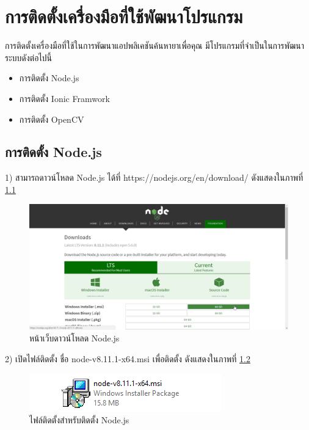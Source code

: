\chapter{การติดตั้งเครื่องมือที่ใช้พัฒนาโปรแกรม}
การติดตั้งเครื่องมือที่ใช้ในการพัฒนาแอปพลิเคชันค้นหายาเพื่อคุณ มีโปรแกรมที่จำเป็นในการพัฒนาระบบดังต่อไปนี้
\begin{itemize}[label={--}]
	\item การติดตั้ง Node.js
    \item การติดตั้ง Ionic Framwork
    \item การติดตั้ง OpenCV
\end{itemize}

\section{การติดตั้ง Node.js}
    1) สามารถดาวน์โหลด Node.js ได้ที่ https://nodejs.org/en/download/ ดังแสดงในภาพที่ \ref{Fig:nodeInstall1}
      \begin{figure}[H]
          \includegraphics[width=\columnwidth]{Figures/7/1}
          \caption{หน้าเว็บดาวน์โหลด Node.js}
          \label{Fig:nodeInstall1}
      \end{figure}
      
    2) เปิดไฟล์ติดตั้ง ชื่อ node-v8.11.1-x64.msi เพื่อติดตั้ง ดังแสดงในภาพที่ \ref{Fig:nodeInstall2}
      \begin{figure}[H]
          \includegraphics[width=\columnwidth]{Figures/7/2}
          \caption{ไฟล์ติดตั้งสำหรับติดตั้ง Node.js}
          \label{Fig:nodeInstall2}
      \end{figure}

